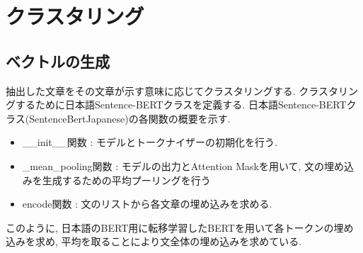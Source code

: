
\section{クラスタリング}
\subsection{ベクトルの生成}
抽出した文章をその文章が示す意味に応じてクラスタリングする. クラスタリングするために日本語Sentence-BERTクラスを定義する. 日本語Sentence-BERTクラス(SentenceBertJapanese)の各関数の概要を示す. 
\begin{itemize}
  \item \_\_init\_\_関数 : モデルとトークナイザーの初期化を行う. 
  \item \_mean\_pooling関数 : モデルの出力とAttention Maskを用いて, 文の埋め込みを生成するための平均プーリングを行う
  \item encode関数 : 文のリストから各文章の埋め込みを求める. 
\end{itemize}

このように, 日本語のBERT用に転移学習したBERTを用いて各トークンの埋め込みを求め, 平均を取ることにより文全体の埋め込みを求めている. 





